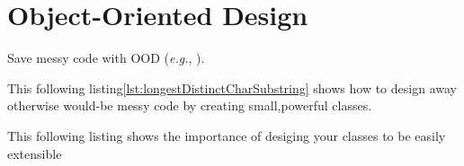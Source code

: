 
\chapter{Object-Oriented Design} \label{ch:ood}
Save messy code with OOD (\textit{e.g.}, ).

This following listing\ref{lst:longestDistinctCharSubstring} shows how to design away
otherwise would-be messy code by creating small,powerful classes.


\label{Evernote:Longest Substring with At Most K Distinct Characters}

This following listing shows the importance of desiging your classes to be easily extensible


\label{Evernote:Flatten 2D Vector}


\label{Evernote:Flatten 3D vector}
